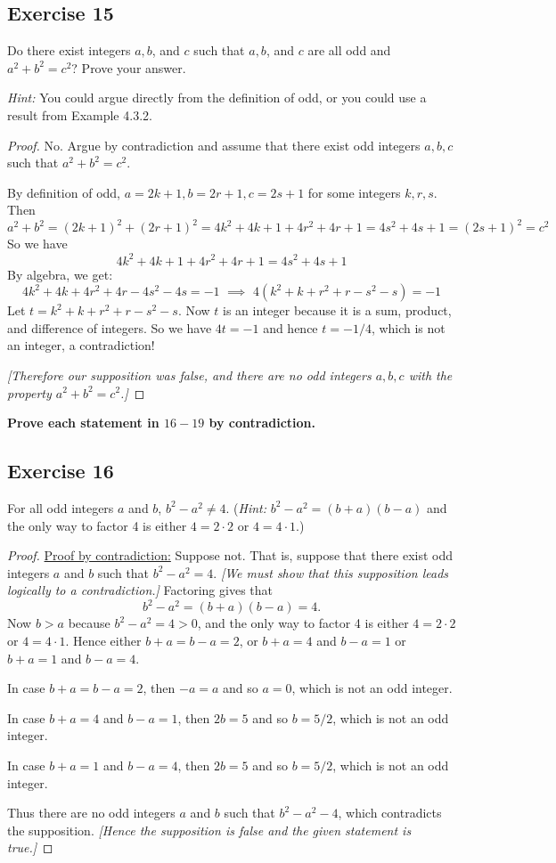 \documentclass[14pt]{extarticle}
\newcommand{\cy}{\color{cyan}}
\begin{document}
\subsection{Exercise 15}
Do there exist integers $a, b$, and $c$ such that $a, b$, and $c$ are all odd and $a^2 + b^2 = c^2$? Prove your answer.

{\it Hint:} You could argue directly from the definition of odd, or you could use a result from Example 4.3.2.

\begin{proof}
No. Argue by contradiction and assume that there exist odd integers $a,b,c$ such that $a^2 + b^2 = c^2$.

By definition of odd, $a = 2k+1, b = 2r + 1, c = 2s+1$ for some integers $k,r,s$. Then
\[
a^2 + b^2 = (2k+1)^2 + (2r+1)^2 = 4k^2+4k+1+4r^2+4r+1 = 4s^2+4s+1 = (2s+1)^2 = c^2
\]
So we have 
\[
4k^2+4k+1+4r^2+4r+1 = 4s^2+4s+1
\]
By algebra, we get:
\[
4k^2+4k+4r^2+4r-4s^2-4s = -1 \,\, \implies \,\, 4(k^2+k+r^2+r-s^2-s) = -1
\]
Let $t = k^2+k+r^2+r-s^2-s$. Now $t$ is an integer because it is a sum, product, and difference of integers. So we have $4t = -1$ and hence $t = -1/4$, which is not an integer, a contradiction!

{\it [Therefore our supposition was false, and there are no odd integers $a,b,c$ with the property $a^2 + b^2 = c^2$.]}
\end{proof}

{\bf \cy Prove each statement in $16-19$ by contradiction.}

\subsection{Exercise 16}
For all odd integers $a$ and $b$, $b^2 - a^2 \neq 4$. ({\it Hint:} $b^2 - a^2 = (b + a)(b - a)$ and the only way to factor 4 is either $4 = 2\cdot2$ or $4 = 4\cdot1$.)

\begin{proof}
\underline{Proof by contradiction:} Suppose not. That is, suppose that there exist odd integers $a$ and $b$ such that $b^2 - a^2 = 4$. {\it [We must show that this supposition leads logically to a contradiction.]} Factoring gives that
\[
b^2 - a^2 = (b + a)(b - a) = 4. 
\] 
Now $b > a$ because $b^2 - a^2 = 4 > 0$, and the only way to factor 4 is either $4 = 2\cdot2$ or $4 = 4\cdot1$. Hence either $b + a = b - a = 2$, or $b + a = 4$ and $b - a = 1$ or $b + a = 1$ and $b - a = 4$.

In case $b + a = b - a = 2$, then $-a = a$ and so $a = 0$, which is not an odd integer. 

In case $b + a = 4$ and $b - a = 1$, then $2b = 5$ and so $b = 5/2$, which is not an odd integer. 

In case $b + a = 1$ and $b - a = 4$, then $2b = 5$ and so $b = 5/2$, which is not an odd integer. 

Thus there are no odd integers $a$ and $b$ such that $b^2 - a^2 - 4$, which contradicts the supposition. {\it [Hence the supposition is false and the given statement is true.]}
\end{proof}
\end{document}

